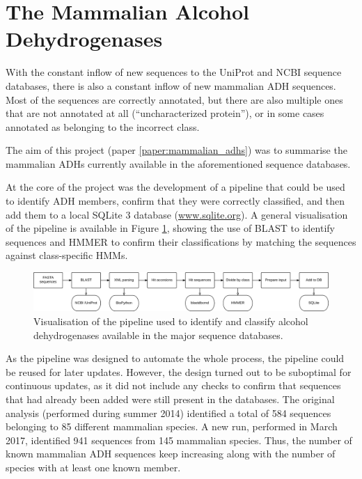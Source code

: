 \documentclass[a4paper, twoside, 12pt, openright]{report}
\begin{document}
\section{The Mammalian Alcohol Dehydrogenases}
\label{sec:mammalian_adhs}

With the constant inflow of new sequences to the UniProt and NCBI sequence databases, there is also a constant inflow of new mammalian ADH sequences. Most of the sequences are correctly annotated, but there are also multiple ones that are not annotated at all (``uncharacterized protein''), or in some cases annotated as belonging to the incorrect class.

The aim of this project (paper \ref{paper:mammalian_adhs}) was to summarise the mammalian ADHs currently available in the aforementioned sequence databases.

At the core of the project was the development of a pipeline that could be used to identify ADH members, confirm that they were correctly classified, and then add them to a local SQLite 3 database (\url{www.sqlite.org}). A general visualisation of the pipeline is available in Figure \ref{fig:adh_pipeline}, showing the use of BLAST \cite{altschul_gapped_1997, camacho_blast+:_2009} to identify sequences and HMMER \cite{eddy_accelerated_2011} to confirm their classifications by matching the sequences against class-specific HMMs.

\begin{figure}[htbp]
 \includegraphics[width=\textwidth]{fig/adh_pipeline.png}
 \caption{Visualisation of the pipeline used to identify and classify alcohol dehydrogenases available in the major sequence databases.}
 \label{fig:adh_pipeline}
\end{figure}

As the pipeline was designed to automate the whole process, the pipeline could be reused for later updates. However, the design turned out to be suboptimal for continuous updates, as it did not include any checks to confirm that sequences that had already been added were still present in the databases. The original analysis (performed during summer 2014) identified a total of 584 sequences belonging to 85 different mammalian species. A new run, performed in March 2017, identified 941 sequences from 145 mammalian species. Thus, the number of known mammalian ADH sequences keep increasing along with the number of species with at least one known member.
\end{document}
